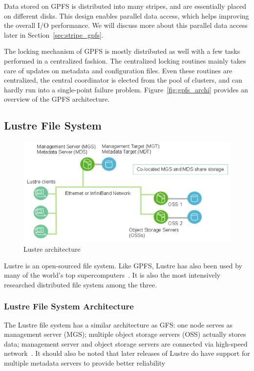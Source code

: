 Data stored on GPFS is distributed into many stripes, and are essentially
placed on different disks.
%
This design enables parallel data access, which helps improving the overall
I/O performance.
%
We will discuss more about this parallel data access 
later in Section~\ref{sec:stripe_gpfs}.

The locking mechanism of GPFS is mostly distributed as well with a few tasks
performed in a centralized fashion.
%
The centralized locking routines mainly takes care of updates on metadata
and configuration files.
%
Even these routines are centralized, the central coordinator is elected from
the pool of clusters, and can hardly run into a single-point failure problem.
%
Figure~\ref{fig:gpfs_archi} provides an overview of the GPFS architecture.



\subsection{Lustre File System}
\label{sec:archi_lustre}
%
\begin{figure}
\centering
\includegraphics[width=0.99\columnwidth]{image/lustre_architecture.png}
\caption{Lustre architecture}
\label{fig:lustre_archi}
\end{figure}
%
Lustre is an open-sourced file system. 
%
Like GPFS, Lustre has also been used by many of the world's top 
supercomputers~\cite{Strohmaier:2006:TS:1188455.1188474}.
%
It is also the most intensively researched distributed file system among 
the three. 

\subsubsection{Lustre File System Architecture}
The Lustre file system has a similar architecture as GFS:
one node serves as management server (MGS); 
multiple object storage servers (OSS) actually stores data;
management server and object storage servers are connected via
high-speed network~\cite{Schwan2003,braamlustre}.
%
It should also be noted that later releases of Lustre do have support
for multiple metadata servers to provide better reliability

